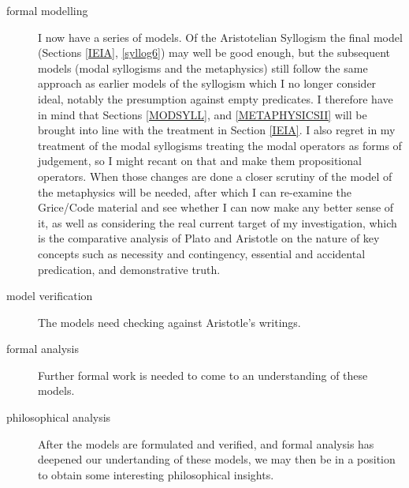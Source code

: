 \begin{description}
\item[formal modelling]
I now have a series of models.
Of the Aristotelian Syllogism the final model (Sections \ref{IEIA}, \ref{syllog6}) may well be good enough, but the subsequent models (modal syllogisms and the metaphysics) still follow the same approach as earlier models of the syllogism which I no longer consider ideal, notably the presumption against empty predicates.
I therefore have in mind that Sections \ref{MODSYLL}, and \ref{METAPHYSICSII} will be brought into line with the treatment in Section \ref{IEIA}.
I also regret in my treatment of the modal syllogisms treating the modal operators as forms of judgement, so I might recant on that and make them propositional operators.
When those changes are done a closer scrutiny of the model of the metaphysics will be needed, after which I can re-examine the Grice/Code material and see whether I can now make any better sense of it, as well as considering the real current target of my investigation, which is the comparative analysis of Plato and Aristotle on the nature of key concepts such as necessity and contingency, essential and accidental predication, and demonstrative truth.

\item[model verification]
The models need checking against Aristotle's writings.

\item[formal analysis]
Further formal work is needed to come to an understanding of these models.

\item[philosophical analysis]
After the models are formulated and verified, and formal analysis has deepened our undertanding of these models, we may then be in a position to obtain some interesting philosophical insights.

\end{description}

\pagebreak
\appendix

\vfill


